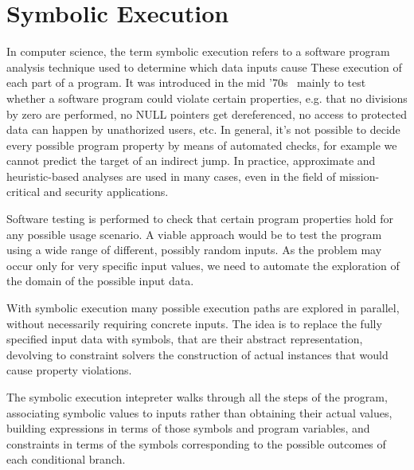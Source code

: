 \section{Symbolic Execution}
In computer science, the term symbolic execution refers to a software program analysis technique used to determine which data inputs cause These execution of each part of a program. It was introduced in the mid '70s~\cite{K-ICRS75,SELECT-ICRS75,K-CACM76,H-TSE77} mainly to test whether a software program could violate certain properties, e.g. that no divisions by zero are performed, no NULL pointers get dereferenced, no access to protected data can happen by unathorized users, etc. In general, it's not possible to decide every possible program property by means of automated checks, for example we cannot predict the target of an indirect jump. %
In practice, approximate and heuristic-based analyses are used in many cases, even in the field of mission-critical and security applications.

Software testing is performed to check that certain program properties hold for any possible usage scenario. A viable approach would be to test the program using a wide range of different, possibly random inputs. As the problem may occur only for very specific input values, we need to automate the exploration of the domain of the possible input data. 

With symbolic execution many possible execution paths are explored in parallel, without necessarily requiring concrete inputs. The idea is to replace the fully specified input data with symbols, that are their abstract representation, devolving to constraint solvers the construction of actual instances that would cause property violations. 

The symbolic execution intepreter walks through all the steps of the program, associating symbolic values to inputs rather than obtaining their actual values, building  expressions in terms of those symbols and program variables, and constraints in terms of the symbols corresponding to the possible outcomes of each conditional branch. 

